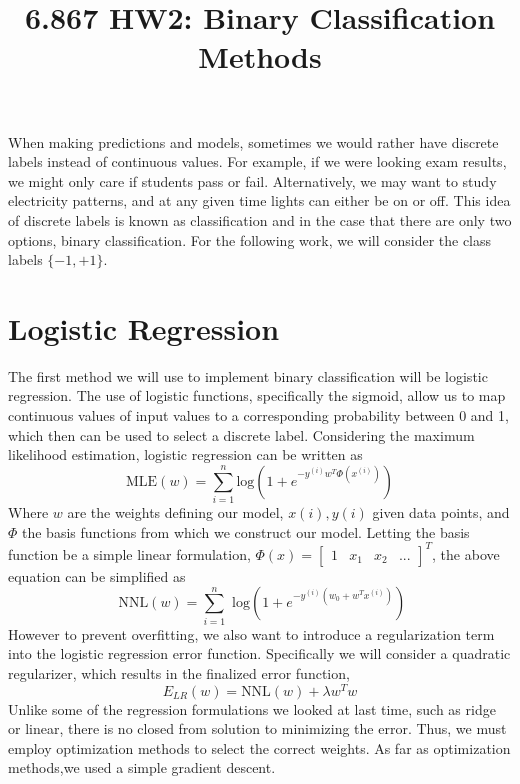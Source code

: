 \documentclass[10pt,twocolumn]{article}
\begin{document}
\title{6.867 HW2: Binary Classification Methods}
\maketitle
When making predictions and models, sometimes we would rather have discrete labels instead of continuous values. For example, if we were looking exam results, we might only care if students pass or fail. Alternatively, we may want to study electricity patterns, and at any given time lights can either be on or off. This idea of discrete labels is known as classification and in the case that there are only two options, binary classification. For the following work, we will consider the class labels $\{-1, +1\}$. 

\section{Logistic Regression}
 
 The first method we will use to implement binary classification will be logistic regression. The use of logistic functions, specifically the sigmoid, allow us to map continuous values of input values to a corresponding probability between 0 and 1, which then can be used to select a discrete label. Considering the maximum likelihood estimation, logistic regression can be written as 
 \begin{equation}
 \textrm{MLE}(w)= \sum_{i=1}^{n} \textrm{log}(1+e^{-y^{(i)}w^T \Phi(x^{(i)})})
 \end{equation}
 Where $w$ are the weights defining our model, $x(i), y(i)$ given data points, and $\Phi$ the basis functions from which we construct our model. Letting the basis function be a simple linear formulation, $\Phi(x)= \begin{bmatrix} 1 & x _1 & x_2 & ... \end{bmatrix}^T$, the above equation can be simplified as 
 \begin{equation}
\textrm{ NNL}(w)= \sum_{i=1}^{n}\textrm{ log}(1+e^{-y^{(i)}(w_0+w^Tx^{(i)})})
 \end{equation}
 However to prevent overfitting, we also want to introduce a regularization term into the logistic regression error function. Specifically we will consider a quadratic regularizer, which results in the finalized error function, 
 \begin{equation}
 E_{LR}(w)= \textrm{NNL}(w) +\lambda w^Tw
 \end{equation}
 Unlike some of the regression formulations we looked at last time, such as ridge or linear, there is no closed from solution to minimizing the error. Thus, we must employ optimization methods to select the correct weights. As far as optimization methods,we used a simple gradient descent. 
 
\end{document}
